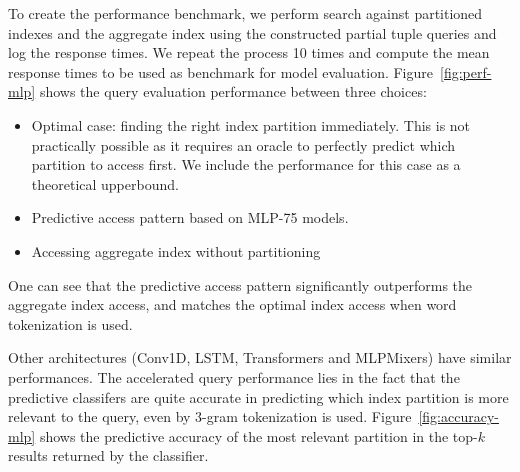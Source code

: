 \documentclass[conference]{IEEEtran}
\begin{document}
To create the performance benchmark, we perform search against partitioned indexes and the aggregate index using the constructed partial tuple queries and log the response times. We repeat the process 10 times and compute the mean response times to be used as benchmark for model evaluation. Figure~\ref{fig:perf-mlp} shows the query evaluation performance between three choices:
\begin{itemize}
\item Optimal case: finding the right index partition immediately.  This is not practically possible as it requires an oracle to perfectly predict which partition to access first.  We include the performance for this case as a theoretical upperbound.
\item Predictive access pattern based on MLP-75 models.
\item Accessing aggregate index without partitioning
\end{itemize}
One can see that the predictive access pattern significantly outperforms
the aggregate index access, and matches the optimal index access when word tokenization is used.

Other architectures (Conv1D, LSTM, Transformers and MLPMixers) have similar performances.  The accelerated query performance lies in the fact that the predictive classifers are quite accurate in predicting which index partition
is more relevant to the query, even by 3-gram tokenization is used.  Figure~\ref{fig:accuracy-mlp} shows the predictive accuracy of the most relevant partition in the top-$k$ results returned by the classifier.
\end{document}
